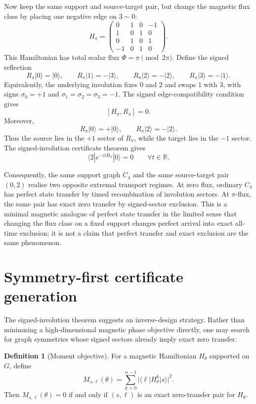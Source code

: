 \documentclass[11pt]{article}
\theoremstyle{definition}
\newtheorem{definition}[theorem]{Definition}
\newcommand{\R}{\mathbb R}
\begin{document}
Now keep the same support and source-target pair, but change the magnetic flux class by placing one negative edge on $3\sim0$:
\[
H_\pi=
\begin{pmatrix}
0&1&0&-1\\
1&0&1&0\\
0&1&0&1\\
-1&0&1&0
\end{pmatrix}.
\]
This Hamiltonian has total scalar flux $\Phi=\pi\pmod{2\pi}$.  Define the signed reflection
\[
R_\pi|0\rangle=|0\rangle,
\qquad
R_\pi|1\rangle=-|3\rangle,
\qquad
R_\pi|2\rangle=-|2\rangle,
\qquad
R_\pi|3\rangle=-|1\rangle.
\]
Equivalently, the underlying involution fixes $0$ and $2$ and swaps $1$ with $3$, with signs $\sigma_0=+1$ and $\sigma_1=\sigma_2=\sigma_3=-1$.  The signed edge-compatibility condition gives
\[
[H_\pi,R_\pi]=0.
\]
Moreover,
\[
R_\pi|0\rangle=+|0\rangle,
\qquad
R_\pi|2\rangle=-|2\rangle.
\]
Thus the source lies in the $+1$ sector of $R_\pi$, while the target lies in the $-1$ sector.  The signed-involution certificate theorem gives
\[
\langle 2|e^{-itH_\pi}|0\rangle=0
\qquad \forall t\in\R .
\]

Consequently, the same support graph $C_4$ and the same source-target pair $(0,2)$ realise two opposite extremal transport regimes.  At zero flux, ordinary $C_4$ has perfect state transfer by timed recombination of involution sectors.  At $\pi$-flux, the same pair has exact zero transfer by signed-sector exclusion.  This is a minimal magnetic analogue of perfect state transfer in the limited sense that changing the flux class on a fixed support changes perfect arrival into exact all-time exclusion; it is not a claim that perfect transfer and exact exclusion are the same phenomenon.

\section{Symmetry-first certificate generation}
The signed-involution theorem suggests an inverse-design strategy. Rather than minimising a high-dimensional magnetic phase objective directly, one may search for graph symmetries whose signed sectors already imply exact zero transfer.

\begin{definition}[Moment objective]
For a magnetic Hamiltonian $H_\theta$ supported on $G$, define
\[
M_{s,\ell}(\theta)=\sum_{k=0}^{n-1}|\langle \ell|H_\theta^k|s\rangle|^2.
\]
Then $M_{s,\ell}(\theta)=0$ if and only if $(s,\ell)$ is an exact zero-transfer pair for $H_\theta$.
\end{definition}
\end{document}
